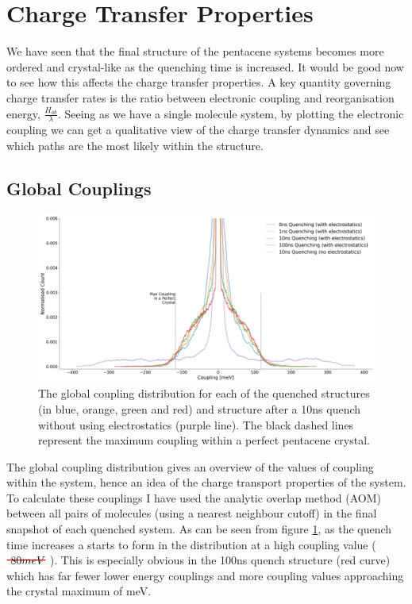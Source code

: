\section{Charge Transfer Properties}
We have seen that the final structure of the pentacene systems becomes more ordered and crystal-like as the quenching time is increased. It would be good now to see how this affects the charge transfer properties. A key quantity governing charge transfer rates is the ratio between electronic coupling and reorganisation energy, $\frac{H_{ab}}{\lambda}$. Seeing as we have a single molecule system, by plotting the electronic coupling we can get a qualitative view of the charge transfer dynamics and see which paths are the most likely within the structure.
\subsection{Global Couplings}
\label{sect:GlobCoup}
\begin{figure}[ht]
	\includegraphics[width=\textwidth]{../img/DifferentQuenchTimes/GlobalCouplings.png}
	\caption{\label{fig:glob_coup}The global coupling distribution for each of the quenched structures (in blue, orange, green and red) and  structure after a 10ns quench without using electrostatics (purple line). The black dashed lines represent the maximum coupling within a perfect pentacene crystal.}
\end{figure}
\noindent The global coupling distribution gives an overview of the values of coupling within the system, hence an idea of the charge transport properties of the system. To calculate these couplings I have used the analytic overlap method (AOM)\cite{gajdos_ultrafast_2014} between all pairs of molecules (using a nearest neighbour cutoff) in the final snapshot of each quenched system. As can be seen from figure \ref{fig:glob_coup}, as the quench time increases a  starts to form in the distribution at a high coupling value ($\mremove{~80 meV}$ ). This is especially obvious in the 100ns quench structure (red curve) which has far fewer lower energy couplings and more coupling values approaching the crystal maximum of  meV.
